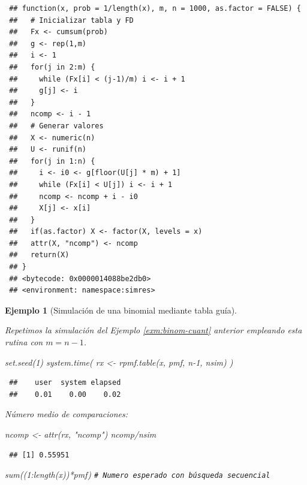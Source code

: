 \documentclass[
]{book}
\newenvironment{Shaded}{\begin{snugshade}}{\end{snugshade}}
\newcommand{\CommentTok}[1]{\textcolor[rgb]{0.56,0.35,0.01}{\textit{#1}}}
\newcommand{\DecValTok}[1]{\textcolor[rgb]{0.00,0.00,0.81}{#1}}
\newcommand{\FunctionTok}[1]{\textcolor[rgb]{0.00,0.00,0.00}{#1}}
\newcommand{\NormalTok}[1]{#1}
\newcommand{\OtherTok}[1]{\textcolor[rgb]{0.56,0.35,0.01}{#1}}
\newcommand{\SpecialCharTok}[1]{\textcolor[rgb]{0.00,0.00,0.00}{#1}}
\newcommand{\StringTok}[1]{\textcolor[rgb]{0.31,0.60,0.02}{#1}}
\theoremstyle{break}
\newtheorem{example}{Ejemplo}[chapter]
\theoremstyle{nonumberplain}
\renewcommand{\CommentTok}[1]{\textcolor[rgb]{0.41,0.41,0.41}{\texttt{#1}}}
\begin{document}
\begin{verbatim}
 ## function(x, prob = 1/length(x), m, n = 1000, as.factor = FALSE) {
 ##   # Inicializar tabla y FD
 ##   Fx <- cumsum(prob)
 ##   g <- rep(1,m)
 ##   i <- 1
 ##   for(j in 2:m) {
 ##     while (Fx[i] < (j-1)/m) i <- i + 1
 ##     g[j] <- i
 ##   }
 ##   ncomp <- i - 1
 ##   # Generar valores
 ##   X <- numeric(n)
 ##   U <- runif(n)
 ##   for(j in 1:n) {
 ##     i <- i0 <- g[floor(U[j] * m) + 1]
 ##     while (Fx[i] < U[j]) i <- i + 1
 ##     ncomp <- ncomp + i - i0
 ##     X[j] <- x[i]
 ##   }
 ##   if(as.factor) X <- factor(X, levels = x)
 ##   attr(X, "ncomp") <- ncomp
 ##   return(X)
 ## }
 ## <bytecode: 0x0000014088be2db0>
 ## <environment: namespace:simres>
\end{verbatim}

\begin{example}[Simulación de una binomial mediante tabla guía]
\protect\hypertarget{exm:binom-tabla}{}\label{exm:binom-tabla}

Repetimos la simulación del Ejemplo \ref{exm:binom-cuant} anterior empleando esta rutina con \(m=n-1\).

\begin{Shaded}
\begin{Highlighting}[]
\FunctionTok{set.seed}\NormalTok{(}\DecValTok{1}\NormalTok{)}
\FunctionTok{system.time}\NormalTok{( rx }\OtherTok{\textless{}{-}} \FunctionTok{rpmf.table}\NormalTok{(x, pmf, n}\DecValTok{{-}1}\NormalTok{, nsim) )}
\end{Highlighting}
\end{Shaded}

\begin{verbatim}
 ##    user  system elapsed 
 ##    0.01    0.00    0.02
\end{verbatim}

Número medio de comparaciones:

\begin{Shaded}
\begin{Highlighting}[]
\NormalTok{ncomp }\OtherTok{\textless{}{-}} \FunctionTok{attr}\NormalTok{(rx, }\StringTok{"ncomp"}\NormalTok{)}
\NormalTok{ncomp}\SpecialCharTok{/}\NormalTok{nsim}
\end{Highlighting}
\end{Shaded}

\begin{verbatim}
 ## [1] 0.55951
\end{verbatim}

\begin{Shaded}
\begin{Highlighting}[]
\FunctionTok{sum}\NormalTok{((}\DecValTok{1}\SpecialCharTok{:}\FunctionTok{length}\NormalTok{(x))}\SpecialCharTok{*}\NormalTok{pmf) }\CommentTok{\# Numero esperado con búsqueda secuencial}
\end{Highlighting}
\end{Shaded}


\end{example}
\end{document}
